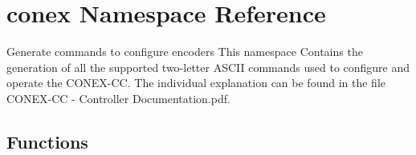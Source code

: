 \hypertarget{namespaceconex}{}\section{conex Namespace Reference}
\label{namespaceconex}


Generate commands to configure encoders This namespace Contains the generation of all the supported two-\/letter A\+S\+C\+II commands used to configure and operate the C\+O\+N\+E\+X-\/\+CC. The individual explanation can be found in the file \textquotesingle{}C\+O\+N\+E\+X-\/\+CC -\/ Controller Documentation.\+pdf\textquotesingle{}.  


\subsection*{Functions}
